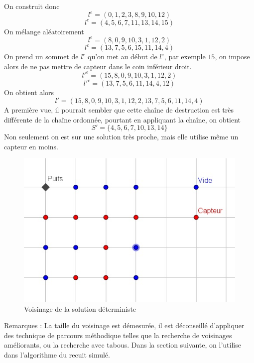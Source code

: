 \documentclass[12pt,a4paper]{article}
\begin{document}
On construit donc 
\[l^e=(0,1,2,3,8,9,10,12)\]
\[l^c=(4,5,6,7,11,13,14,15)\]
On mélange aléatoirement
\[l^e=(8,0,9,10,3,1,12,2)\]
\[l^c=(13,7,5,6,15,11,14,4)\]
On prend un sommet de $l^c$ qu'on met au début de $l^e$, par exemple $15$, on impose alors de ne pas mettre de capteur dans le coin inférieur droit.
\[l'^e=(15,8,0,9,10,3,1,12,2)\]
\[l'^c=(13,7,5,6,11,14,4,12)\]
On obtient alors 
\[l'=(15,8,0,9,10,3,1,12,2,13,7,5,6,11,14,4)\]
A première vue, il pourrait sembler que cette chaîne de destruction est très différente de la chaîne ordonnée, pourtant en appliquant la chaîne, on obtient
\[S'=\{4,5,6,7,10,13,14\}\]
Non seulement on est sur une solution très proche, mais elle utilise même un capteur en moins.
\begin{figure}[!h]
\center
\includegraphics[scale=1]{Images/4_1_1_neigh.jpg}
\caption{Voisinage de la solution déterministe}
\end{figure}

Remarques : La taille du voisinage est démesurée, il est déconseillé d'appliquer des technique de parcours méthodique telles que la recherche de voisinages améliorants, ou la recherche avec tabous. Dans la section suivante, on l'utilise dans l'algorithme du recuit simulé.
\end{document}
